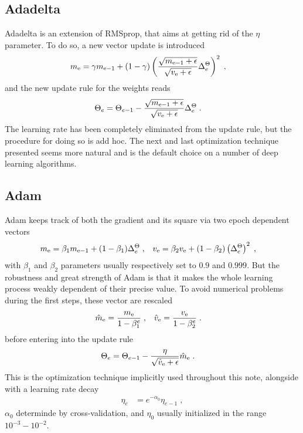 \subsection{Adadelta}

Adadelta\cite{journals/corr/abs-1212-5701} is an extension of RMSprop, that aims at getting rid of the $\eta$ parameter. To do so, a new vector update is introduced
\begin{align}
m_{{\rm e}}&=\gamma m_{{\rm e-1}}+(1-\gamma )
%
\left(\frac{\sqrt{m_{{\rm e-1}}+\epsilon}}{\sqrt{v_{{\rm e}}+\epsilon}}\Delta^{\Theta}_{e}\right)^2\;,
\end{align}
and the new update rule for the weights reads
\begin{align}
\Theta_e&=\Theta_{e-1}-\frac{\sqrt{m_{{\rm e-1}}+\epsilon}}{\sqrt{v_{{\rm e}}+\epsilon}}\Delta^{\Theta}_{e}\;.
\end{align}
The learning rate has been completely eliminated from the update rule, but the procedure for doing so is add hoc. The next and last optimization technique presented seems more natural and is the default choice on a number of deep learning algorithms.
\subsection{Adam}

Adam\cite{Kingma2014} keeps track of both the gradient and its square via two epoch dependent vectors
\begin{align}
m_{{\rm e}}&= \beta_1 m_{{\rm e-1}}+ (1-\beta_1)\Delta^{\Theta}_{e}\;,&
%
v_{{\rm e}}&= \beta_2 v_{{\rm e}}+ (1-\beta_2)\left(\Delta^{\Theta}_{e}\right)^2\;,
\end{align}
with $\beta_1$ and $\beta_2$ parameters usually respectively set to $0.9$ and $0.999$. But the robustness and great strength of Adam is that it makes the whole learning process weakly dependent of their precise value. To avoid numerical problems during the first steps, these vector are rescaled
\begin{align}
\hat{m}_{{\rm e}}&= \frac{m_{{\rm e}}}{1-\beta_1^{e}}\;,&
%
\hat{v}_{{\rm e}}&=  \frac{v_{{\rm e}}}{1-\beta_2^{e}}\;.
\end{align}
before entering into the update rule
\begin{align}
\Theta_e&=\Theta_{e-1}-\frac{\eta }{\sqrt{\hat{v}_{{\rm e}}+\epsilon}}\hat{m}_{{\rm e}}\;.
\end{align}
This is the optimization technique implicitly used throughout this note, alongside with a learning rate decay
\begin{align}
\eta_e&=e^{-\alpha_0}\eta_{e-1}\;,
\end{align}
$\alpha_0$ determinde by cross-validation, and $\eta_0$ usually initialized in the range $10^{-3}-10^{-2}$.

